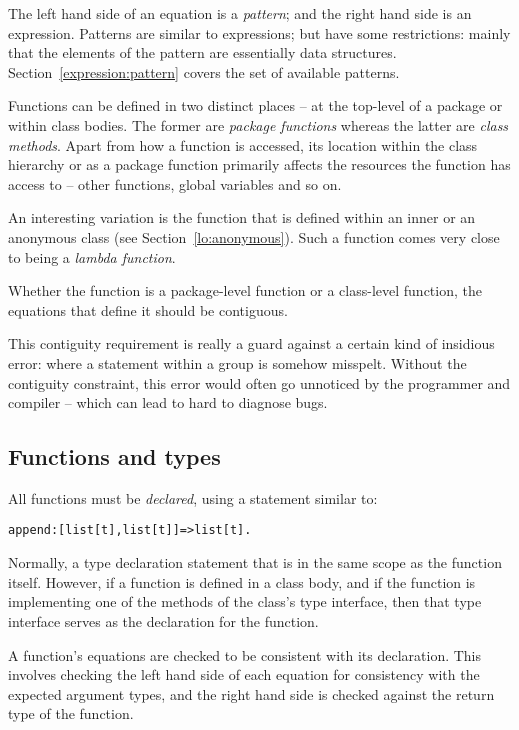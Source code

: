 The left hand side of an equation is a \emph{pattern}; and the right hand side is an expression. Patterns are similar to expressions; but have some restrictions: mainly that the elements of the pattern are essentially data structures. Section~\vref{expression:pattern} covers the set of available patterns.

Functions can be defined in two distinct places -- at the top-level of a package or within class bodies. The former are \emph{package functions} whereas the latter are \emph{class methods}. Apart from how a function is accessed, its location within the class hierarchy or as a package function primarily affects the resources the function has access to -- other functions, global variables and so on.
\begin{aside}
An interesting variation is the function that is defined within an inner or an anonymous class (see Section~\vref{lo:anonymous}). Such a function comes very close to being a \emph{lambda function}.
\end{aside}
Whether the function is a package-level function or a class-level function, the equations that define it should be contiguous.
\begin{aside}
This contiguity requirement is really a guard against a certain kind of insidious error: where a statement within a group is somehow misspelt. Without the contiguity constraint, this error would often go unnoticed by the programmer and compiler -- which can lead to hard to diagnose bugs.
\end{aside}

\subsection{Functions and types}
\label{function:types}
All functions must be \emph{declared}, using a statement similar to:
\begin{alltt}
append:[list[t],list[t]]=>list[t].
\end{alltt}
Normally, a type declaration statement that is in the same scope as the function itself. However, if a function is defined in a class body, and if the function is implementing one of the methods of the class's type interface, then that type interface serves as the declaration for the function.

A function's equations are checked to be consistent with its declaration. This involves checking the left hand side of each equation for consistency with the expected argument types, and the right hand side is checked against the return type of the function.

